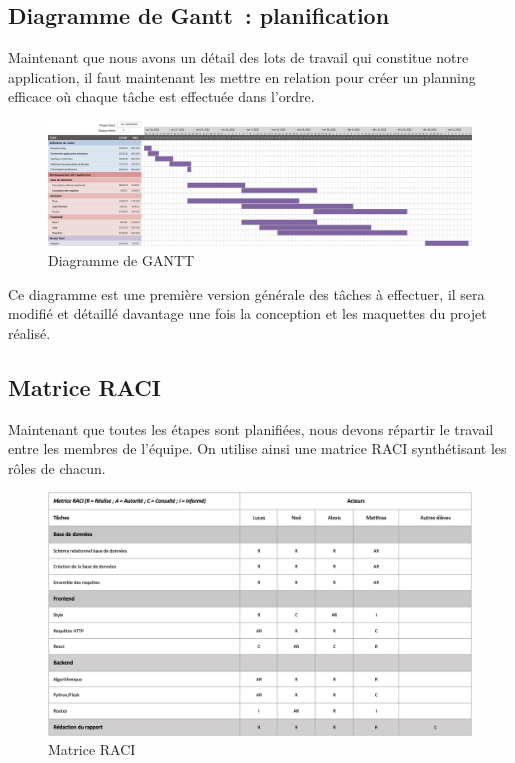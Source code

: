 \documentclass[french,a4paper]{article}
\begin{document}
\subsection{Diagramme de Gantt~: planification}
Maintenant que nous avons un détail des lots de travail qui constitue notre application, il faut maintenant les mettre en relation pour créer un planning efficace où chaque tâche est effectuée dans l’ordre.
\begin{figure}[H]
    \centering
    \includegraphics[width=1\textwidth]{img/gantt.png}
    \caption{Diagramme de GANTT}
\end{figure}
Ce diagramme est une première version générale des tâches à effectuer, il sera modifié et détaillé davantage une fois la conception et les maquettes du projet réalisé.

\subsection{Matrice RACI}
Maintenant que toutes les étapes sont planifiées, nous devons répartir le travail entre les membres de l’équipe. On utilise ainsi une matrice RACI synthétisant les rôles de chacun.

\begin{figure}[H]
    \centering
    \includegraphics[width=1\textwidth]{img/RACI.png}
    \caption{Matrice RACI}
\end{figure}
\end{document}
